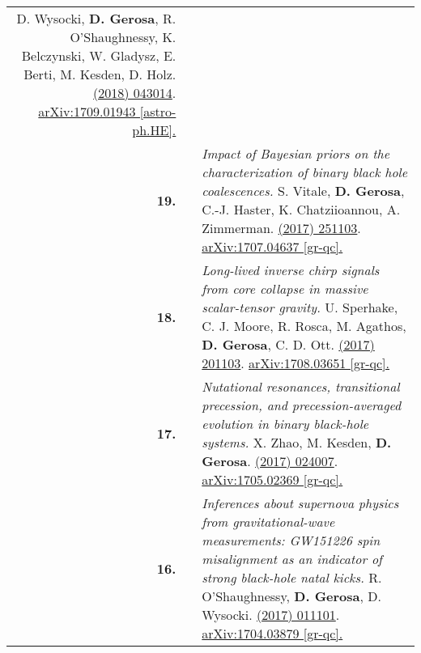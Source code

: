 {\begin{longtable}{rp{0.3cm}p{15.8cm}}
\newline{}
D. Wysocki, \textbf{D. Gerosa}, R. O'Shaughnessy, K. Belczynski, W. Gladysz, E. Berti, M. Kesden, D. Holz.
\newline{}
\href{https://journals.aps.org/prd/abstract/10.1103/PhysRevD.97.043014}{\prd 97 (2018) 043014}. \href{https://arxiv.org/abs/1709.01943}{arXiv:1709.01943 [astro-ph.HE].}
\vspace{0.09cm}\\
%
\textbf{19.} & & \textit{Impact of Bayesian priors on the characterization of binary black hole coalescences.}
\newline{}
S. Vitale, \textbf{D. Gerosa}, C.-J. Haster, K. Chatziioannou, A. Zimmerman.
\newline{}
\href{http://dx.doi.org/10.1103/PhysRevLett.119.251103}{\prl 119 (2017) 251103}. \href{https://arxiv.org/abs/1707.04637}{arXiv:1707.04637 [gr-qc].}
\vspace{0.09cm}\\
%
\textbf{18.} & & \textit{Long-lived inverse chirp signals from core collapse in massive scalar-tensor gravity.}
\newline{}
U. Sperhake, C. J. Moore, R. Rosca, M. Agathos, \textbf{D. Gerosa}, C. D. Ott.
\newline{}
\href{http://dx.doi.org/10.1103/PhysRevLett.119.201103}{\prl 119 (2017) 201103}. \href{https://arxiv.org/abs/1708.03651}{arXiv:1708.03651 [gr-qc].}
\vspace{0.09cm}\\
%
\textbf{17.} & & \textit{Nutational resonances, transitional precession, and precession-averaged evolution in binary black-hole systems.}
\newline{}
X. Zhao, M. Kesden, \textbf{D. Gerosa}.
\newline{}
\href{http://dx.doi.org/10.1103/PhysRevD.96.024007}{\prd 96 (2017) 024007}. \href{https://arxiv.org/abs/1705.02369}{arXiv:1705.02369 [gr-qc].}
\vspace{0.09cm}\\
%
\textbf{16.} & & \textit{Inferences about supernova physics from gravitational-wave measurements: GW151226 spin misalignment as an indicator of strong black-hole natal kicks.}
\newline{}
R. O'Shaughnessy, \textbf{D. Gerosa}, D. Wysocki.
\newline{}
\href{http://dx.doi.org/10.1103/PhysRevLett.119.011101}{\prl 119 (2017) 011101}. \href{https://arxiv.org/abs/1704.03879}{arXiv:1704.03879 [gr-qc].}
\newline{}

\end{longtable}}
